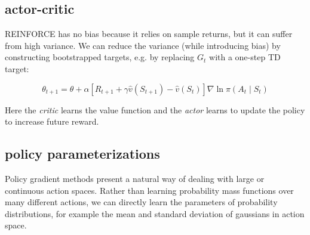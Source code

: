 \subsection{actor-critic}
REINFORCE has no bias because it relies on sample returns, but it can suffer from high variance. We can reduce the variance (while introducing bias) by constructing bootstrapped targets, e.g. by replacing $G_t$ with a one-step TD target:

$$ \theta_{t+1} = \theta + \alpha \left[R_{t+1} + \gamma \hat{v}(S_{t+1}) - \hat{v}(S_t) \right] \nabla \ln \pi (A_t \mid S_t)$$

Here the \textit{critic} learns the value function and the \textit{actor} learns to update the policy to increase future reward.

\subsection{policy parameterizations}
Policy gradient methods present a natural way of dealing with large or continuous action spaces. Rather than learning probability mass functions over many different actions, we can directly learn the parameters of probability distributions, for example the mean and standard deviation of gaussians in action space.
